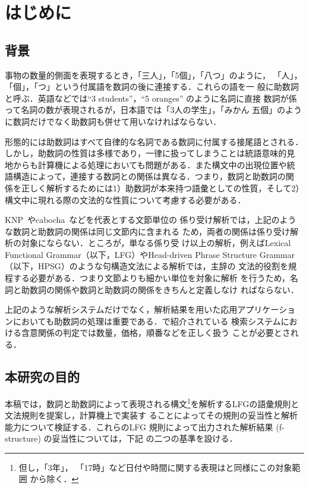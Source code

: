 \documentclass[japanese]{jnlp_1.4}
\begin{document}
\maketitle


\section{はじめに}

\subsection{背景\label{haikei}}

事物の数量的側面を表現するとき，「三人」，「5個」，「八つ」のように，
「人」，「個」，「つ」という付属語を数詞の後に連接する．これらの語を一
般に助数詞と呼ぶ．英語などでは``3 students''，``5 oranges'' のように名詞に直接
数詞が係って名詞の数が表現されるが，日本語では「3人の学生」，「みかん
五個」のように数詞だけでなく助数詞も併せて用いなければならない．

形態的には助数詞はすべて自律的な名詞である数詞に付属する接尾語とされる．
しかし，助数詞の性質は多様であり，一律に扱ってしまうことは統語意味的見
地からも計算機による処理においても問題がある．また構文中の出現位置や統
語構造によって，連接する数詞との関係は異なる．つまり，数詞と助数詞の関
係を正しく解析するためには1）助数詞が本来持つ語彙としての性質，そして2）
構文中に現れる際の文法的な性質について考慮する必要がある．

KNP~\cite{Kurohashi}やcabocha~\cite{cabocha}などを代表とする文節単位の
係り受け解析では，上記のような数詞と助数詞の関係は同じ文節内に含まれる
ため，両者の関係は係り受け解析の対象にならない．ところが，単なる係り受
け以上の解析，例えばLexical Functional Grammar（以下，LFG）やHead-driven Phrase
Structure Grammar（以下，HPSG）のような句構造文法による解析では，主辞の
文法的役割を規程する必要がある．つまり文節よりも細かい単位を対象に解析
を行うため，名詞と助数詞の関係や数詞と助数詞の関係をきちんと定義しなけ
ればならない．

上記のような解析システムだけでなく，解析結果を用いた応用アプリケーショ
ンにおいても助数詞の処理は重要である．\cite{UmemotoNL}で紹介されている
検索システムにおける含意関係の判定では数量，価格，順番などを正しく扱う
ことが必要とされる．






\subsection{\label{mokuteki}本研究の目的}
本稿では，数詞と助数詞によって表現される構文\footnote{但し，「3年」，
「17時」など日付や時間に関する表現は\cite{Bender}と同様にこの対象範囲
から除く．}を解析するLFGの語彙規則と文法規則を提案し，計算機上で実装す
ることによってその規則の妥当性と解析能力について検証する．これらのLFG
規則によって出力された解析結果 (f-structure) の妥当性については，下記
の二つの基準を設ける．
\end{document}

